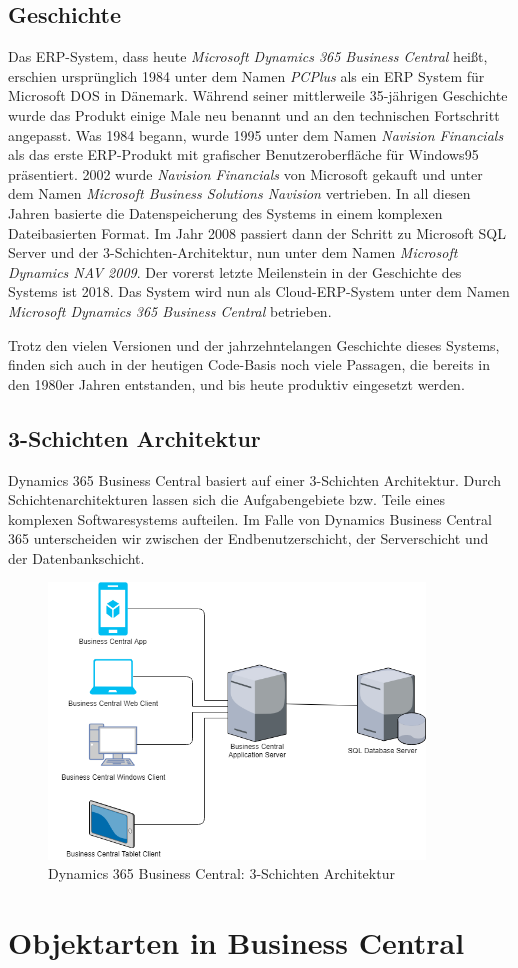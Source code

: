 \subsection{Geschichte}
\label{subsec:Geschichte}
Das ERP-System, dass heute \textit{Microsoft Dynamics 365 Business Central} heißt, erschien ursprünglich 1984 unter dem Namen \textit{PCPlus} als ein ERP System für Microsoft DOS in Dänemark\cite{DesignAndImplementationGayer}. Während seiner mittlerweile 35-jährigen Geschichte wurde das Produkt einige Male neu benannt und an den technischen Fortschritt angepasst. Was 1984 begann, wurde 1995 unter dem Namen \textit{Navision Financials} als das erste ERP-Produkt mit grafischer Benutzeroberfläche für Windows95 präsentiert. 2002 wurde \textit{Navision Financials} von Microsoft gekauft und unter dem Namen \textit{Microsoft Business Solutions Navision} vertrieben. In all diesen Jahren basierte die Datenspeicherung des Systems in einem komplexen Dateibasierten Format. Im Jahr 2008 passiert dann der Schritt zu Microsoft SQL Server und der 3-Schichten-Architektur, nun unter dem Namen \textit{Microsoft Dynamics NAV 2009}. Der vorerst letzte Meilenstein in der Geschichte des Systems ist 2018. Das System wird nun als Cloud-ERP-System unter dem Namen \textit{Microsoft Dynamics 365 Business Central} betrieben.

Trotz den vielen Versionen und der jahrzehntelangen Geschichte dieses Systems, finden sich auch in der heutigen Code-Basis noch viele Passagen, die bereits in den 1980er Jahren entstanden, und bis heute produktiv eingesetzt werden.

\subsection{3-Schichten Architektur}
\label{subsec:3-Schichten Architektur}
Dynamics 365 Business Central basiert auf einer 3-Schichten Architektur. Durch Schichtenarchitekturen lassen sich die Aufgabengebiete bzw. Teile eines komplexen Softwaresystems aufteilen. Im Falle von Dynamics Business Central 365 unterscheiden wir zwischen der Endbenutzerschicht, der Serverschicht und der Datenbankschicht.

\begin{figure}[h]
	\centering
	\includegraphics[width=100mm]{images/3TierArchitecture.png}
	\caption{Dynamics 365 Business Central: 3-Schichten Architektur}
	\label{fig:Image3TierArchitecture}
\end{figure}


\pagebreak
\section{Objektarten in Business Central}
\label{sec:Objektarten in Business Central}